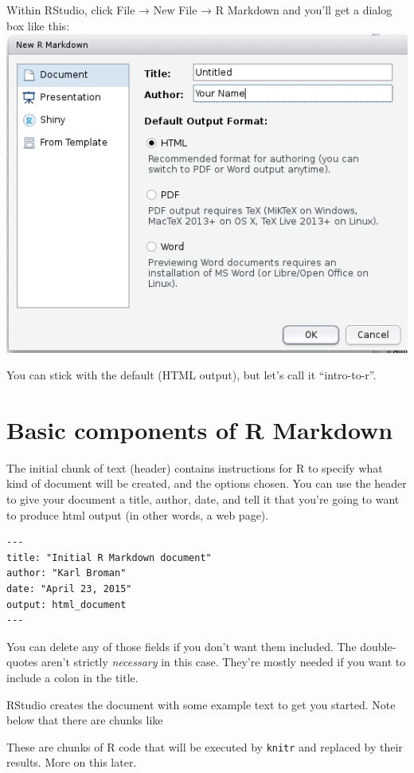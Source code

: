 \documentclass[]{book}
\begin{document}
Within RStudio, click File → New File → R Markdown and you'll get a
dialog box like this: \includegraphics{./fig/New_R_Markdown.png}

You can stick with the default (HTML output), but let's call it
``intro-to-r''.

\section{Basic components of R
Markdown}\label{basic-components-of-r-markdown}

The initial chunk of text (header) contains instructions for R to
specify what kind of document will be created, and the options chosen.
You can use the header to give your document a title, author, date, and
tell it that you're going to want to produce html output (in other
words, a web page).

\begin{verbatim}
---
title: "Initial R Markdown document"
author: "Karl Broman"
date: "April 23, 2015"
output: html_document
---
\end{verbatim}

You can delete any of those fields if you don't want them included. The
double-quotes aren't strictly \emph{necessary} in this case. They're
mostly needed if you want to include a colon in the title.

RStudio creates the document with some example text to get you started.
Note below that there are chunks like

These are chunks of R code that will be executed by \texttt{knitr} and
replaced by their results. More on this later.
\end{document}
